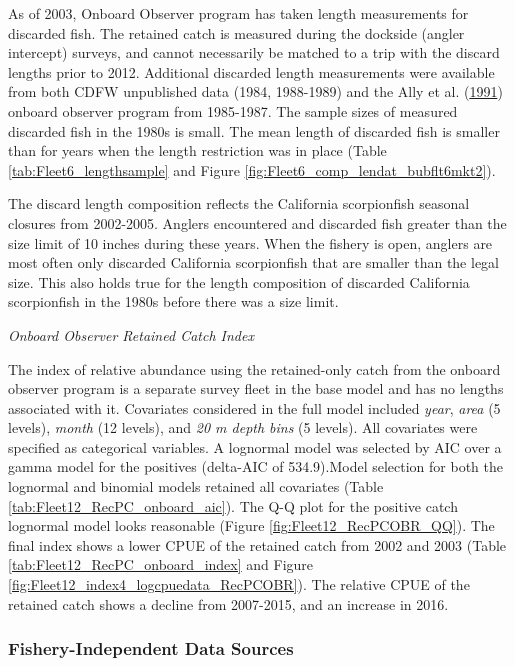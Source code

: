 \documentclass[12pt,]{article}
\begin{document}
As of 2003, Onboard Observer program has taken length measurements for
discarded fish. The retained catch is measured during the dockside
(angler intercept) surveys, and cannot necessarily be matched to a trip
with the discard lengths prior to 2012. Additional discarded length
measurements were available from both CDFW unpublished data (1984,
1988-1989) and the Ally et al. (\protect\hyperlink{ref-Ally1991}{1991})
onboard observer program from 1985-1987. The sample sizes of measured
discarded fish in the 1980s is small. The mean length of discarded fish
is smaller than for years when the length restriction was in place
(Table \ref{tab:Fleet6_lengthsample} and Figure
\ref{fig:Fleet6_comp_lendat_bubflt6mkt2}).

The discard length composition reflects the California scorpionfish
seasonal closures from 2002-2005. Anglers encountered and discarded fish
greater than the size limit of 10 inches during these years. When the
fishery is open, anglers are most often only discarded California
scorpionfish that are smaller than the legal size. This also holds true
for the length composition of discarded California scorpionfish in the
1980s before there was a size limit.

\emph{Onboard Observer Retained Catch Index}

The index of relative abundance using the retained-only catch from the
onboard observer program is a separate survey fleet in the base model
and has no lengths associated with it. Covariates considered in the full
model included \emph{year}, \emph{area} (5 levels), \emph{month} (12
levels), and \emph{20 m depth bins} (5 levels). All covariates were
specified as categorical variables. A lognormal model was selected by
AIC over a gamma model for the positives (delta-AIC of 534.9).Model
selection for both the lognormal and binomial models retained all
covariates (Table \ref{tab:Fleet12_RecPC_onboard_aic}). The Q-Q plot for
the positive catch lognormal model looks reasonable (Figure
\ref{fig:Fleet12_RecPCOBR_QQ}). The final index shows a lower CPUE of
the retained catch from 2002 and 2003 (Table
\ref{tab:Fleet12_RecPC_onboard_index} and Figure
\ref{fig:Fleet12_index4_logcpuedata_RecPCOBR}). The relative CPUE of the
retained catch shows a decline from 2007-2015, and an increase in 2016.

\subsubsection{Fishery-Independent Data
Sources}\label{fishery-independent-data-sources}
\end{document}
